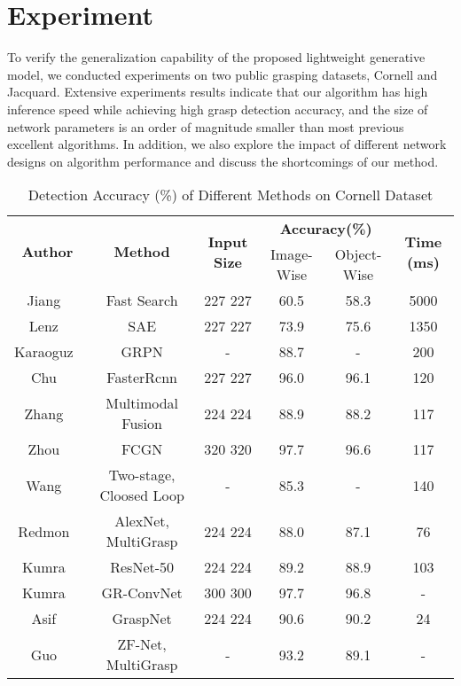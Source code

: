 \documentclass[journal]{IEEEtran}
\begin{document}
\section{Experiment}
To verify the generalization capability of the proposed lightweight generative model, we conducted experiments on two public grasping datasets, Cornell and Jacquard. Extensive experiments results indicate that our algorithm has high inference speed while achieving high grasp detection accuracy, and the size of network parameters is an  order of magnitude smaller than most previous excellent algorithms. In addition, we also explore the impact of different network designs on algorithm performance and discuss the shortcomings of our method.


\begin{table*}[htbp]
	\caption{Detection Accuracy (\%) of Different Methods on Cornell Dataset}
	\begin{center}
		\begin{tabular}{c|c|c|c|c|c}
			\hline
			\multirow{2}{*}{\textbf{Author}} &\multirow{2}{*}{\textbf{Method}}&\multirow{2}{*}{\textbf{Input Size}} &\multicolumn{2}{c|}{\textbf{Accuracy(\%)}}&\multirow{2}{*}{\textbf{Time (ms)}}\\
			\cline{4-5}
			& & &Image-Wise & Object-Wise&\\
			\hline
			Jiang~\cite{jiang}& Fast Search & 227  227 &60.5 & 58.3& 5000\\
			Lenz~\cite{lenz}& SAE & 227  227 & 73.9 & 75.6& 1350\\
			Karaoguz~\cite{kara}& GRPN& - &  88.7 & - & 200\\
			Chu~\cite{chu}& FasterRcnn& 227  227 &  96.0 & 96.1& 120\\
			Zhang~\cite{robust}& Multimodal Fusion& 224  224 &  88.9 & 88.2& 117\\
			Zhou~\cite{zhou}& FCGN & 320  320 &  97.7 & 96.6& 117\\
			Wang~\cite{wang_2}& Two-stage, Cloosed Loop& - &  85.3 & -& 140\\
			Redmon~\cite{Redmon}& AlexNet, MultiGrasp& 224  224 &  88.0 & 87.1& 76\\
			Kumra~\cite{kumra1}& ResNet-50 & 224  224 &  89.2 & 88.9& 103\\
			Kumra~\cite{kumra}& GR-ConvNet & 300 300 &  97.7 & 96.8& -\\
			Asif~\cite{asif}& GraspNet& 224  224 &  90.6 & 90.2& 24\\
		    Guo~\cite{guo}& ZF-Net, MultiGrasp& - &  93.2 & 89.1& -\\

\end{tabular}
\end{center}
\end{table*}
\end{document}
